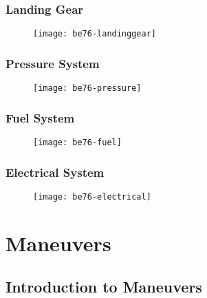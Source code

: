 {\subsection{Landing Gear}

\begin{figure}[H]
\begin{center}
\texttt{[image: be76-landinggear]}
\end{center}
\end{figure}

\newpage


\subsection{Pressure System}

\begin{figure}[H]
\begin{center}
\texttt{[image: be76-pressure]}
\end{center}
\end{figure}


\subsection{Fuel System}

\begin{figure}[H]
\begin{center}
\texttt{[image: be76-fuel]}
\end{center}
\end{figure}


\subsection{Electrical System}

\begin{figure}[H]
\begin{center}
\texttt{[image: be76-electrical]}
\end{center}
\end{figure}

\chapter{Maneuvers}

\section{Introduction to Maneuvers}

}
